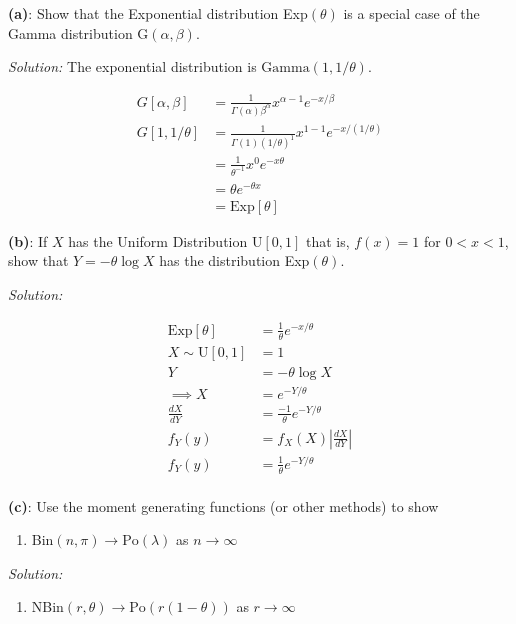 \documentclass[]{article}
\providecommand{\tightlist}{%
  \setlength{\itemsep}{0pt}\setlength{\parskip}{0pt}}
\begin{document}
\textbf{(a)}: Show that the Exponential distribution Exp\((\theta)\) is
a special case of the Gamma distribution G\((\alpha, \beta)\).

\emph{Solution: } The exponential distribution is
\(\text{Gamma}(1, 1/\theta)\).

\begin{align*}
G[\alpha, \beta] &= \frac{1}{\Gamma(\alpha)\beta^\alpha}x^{\alpha-1}e^{-x/\beta}\\
G[1, 1/\theta] &= \frac{1}{\Gamma(1)(1/\theta)^1}x^{1-1}e^{-x/(1/\theta)}\\
                &= \frac{1}{\theta^{-1}}x^0e^{-x\theta}\\
                &= \theta e^{-\theta x}\\
                &= \text{Exp}[\theta]
\end{align*}

\textbf{(b)}: If \(X\) has the Uniform Distribution U\([0,1]\) that is,
\(f(x) = 1\) for \(0 < x < 1\), show that \(Y = -\theta \log X\) has the
distribution Exp\((\theta)\).

\emph{Solution: }

\begin{align*}
\text{Exp}[\theta] &= \frac{1}{\theta} e^{- x/\theta}\\
X \sim \text{U}[0,1] &= 1\\
Y &= -\theta \log X\\
\implies X &= e^{-Y/\theta}\\
\frac{dX}{dY} &= \frac{-1}{\theta}e^{-Y/\theta}\\
f_Y(y) &= f_X(X)\left|\frac{dX}{dY}\right|\\
f_Y(y) &= \frac{1}{\theta}e^{-Y/\theta}\\
\end{align*}

\textbf{(c)}: Use the moment generating functions (or other methods) to
show

\begin{enumerate}
\def\labelenumi{\roman{enumi}.}
\tightlist
\item
  Bin\((n, \pi) \rightarrow \text{Po}(\lambda)\) as
  \(n \rightarrow \infty\)
\end{enumerate}

\emph{Solution: }

\begin{enumerate}
\def\labelenumi{\roman{enumi}.}
\setcounter{enumi}{1}
\tightlist
\item
  NBin\((r, \theta) \rightarrow \text{Po}(r(1 - \theta))\) as
  \(r \rightarrow \infty\)
\end{enumerate}
\end{document}
